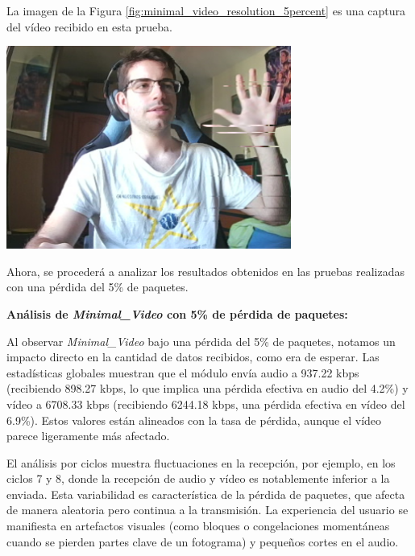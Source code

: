 \newpage
La imagen de la Figura \ref{fig:minimal_video_resolution_5percent} es una captura del vídeo recibido en esta prueba.
\begin{center}
  \includegraphics[width = 0.7\textwidth]{images/VideoRecibido7.3.png}
  \label{fig:minimal_video_resolution_5percent}
\end{center}

\newpage


Ahora, se procederá a analizar los resultados obtenidos en las pruebas realizadas con una pérdida del 5\% de paquetes.
\vspace{\baselineskip}

\textbf{Análisis de \textit{Minimal\_Video} con 5\% de pérdida de paquetes:}
\vspace{\baselineskip}

Al observar \textit{Minimal\_Video} bajo una pérdida del 5\% de paquetes, notamos un impacto directo en la cantidad de datos recibidos, como era de esperar. Las estadísticas globales muestran que el módulo envía audio a 937.22 kbps (recibiendo 898.27 kbps, lo que implica una pérdida efectiva en audio del 4.2\%) y vídeo a 6708.33 kbps (recibiendo 6244.18 kbps, una pérdida efectiva en vídeo del 6.9\%). Estos valores están alineados con la tasa de pérdida, aunque el vídeo parece ligeramente más afectado.
\vspace{\baselineskip}

El análisis por ciclos muestra fluctuaciones en la recepción, por ejemplo, en los ciclos 7 y 8, donde la recepción de audio y vídeo es notablemente inferior a la enviada. Esta variabilidad es característica de la pérdida de paquetes, que afecta de manera aleatoria pero continua a la transmisión. La experiencia del usuario se manifiesta en artefactos visuales (como bloques o congelaciones momentáneas cuando se pierden partes clave de un fotograma) y pequeños cortes en el audio.

